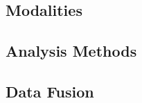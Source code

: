 \documentclass[manuscript,screen,review]{acmart}
\begin{document}
\subsection{Modalities} \label{sec:Modalities}


\subsection{Analysis Methods}


\subsection{Data Fusion}

\end{document}
